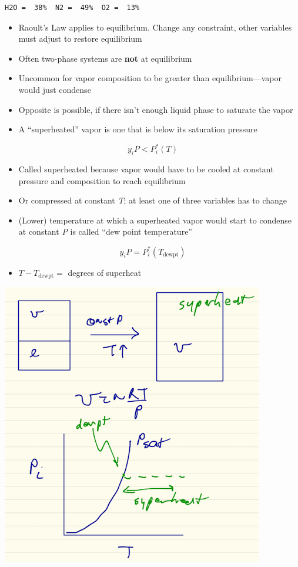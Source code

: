 \documentclass[11pt]{article}
\begin{document}
\begin{verbatim}
H2O =  38%  N2 =  49%  O2 =  13%
\end{verbatim}

\begin{itemize}
\item Raoult's Law applies to equilibrium.  Change any constraint, other variables must adjust to restore equilibrium
\item Often two-phase systems are \textbf{not} at equilibrium
\item Uncommon for vapor composition to be greater than equilibrium---vapor would just condense
\item Opposite is possible, if there isn't enough liquid phase to saturate the vapor
\item A ``superheated'' vapor is one that is below its saturation pressure
\end{itemize}

\[ y_{i} P < P_{i}^{*}(T) \]

\begin{itemize}
\item Called superheated because vapor would have to be cooled at constant pressure and composition to reach equilibrium
\item Or compressed at constant \emph{T}; at least one of three variables has to change
\item (Lower) temperature at which a superheated vapor would start to condense at constant \emph{P} is called ``dew point temperature''
\end{itemize}

\[ y_{i} P = P_{i}^{*}(T_{\text{dewpt}}) \]

\begin{itemize}
\item \( T - T_{\text{dewpt}} =\) degrees of superheat
\end{itemize}

\includegraphics[width=.9\linewidth]{./figs/Superheat.png}
\end{document}
